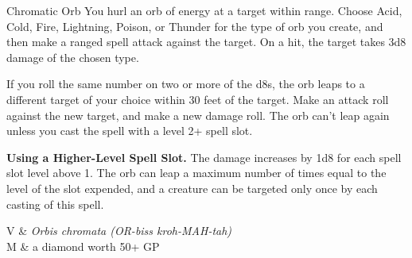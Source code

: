\begin{Spell}[
  level=1st,
  time=1 Action,
  range=90 ft,
  components={V, S, M},
  duration=Instantaneous,
  school=Evocation,
  attack=Ranged,
  effect=Acid...
]{Chromatic Orb}
You hurl an orb of energy at a target within range. Choose Acid, Cold, Fire, Lightning, Poison, or Thunder for the type of orb you create, and then make a ranged spell attack against the target. On a hit, the target takes 3d8 damage of the chosen type.

If you roll the same number on two or more of the d8s, the orb leaps to a different target of your choice within 30 feet of the target. Make an attack roll against the new target, and make a new damage roll. The orb can't leap again unless you cast the spell with a level 2+ spell slot.

\textbf{Using a Higher-Level Spell Slot.} The damage increases by 1d8 for each spell slot level above 1. The orb can leap a maximum number of times equal to the level of the slot expended, and a creature can be targeted only once by each casting of this spell.

\begin{components}
V & \textit{Orbis chromata (OR-biss kroh-MAH-tah)} \\
M & a diamond worth 50+ GP
\end{components}
\end{Spell}


